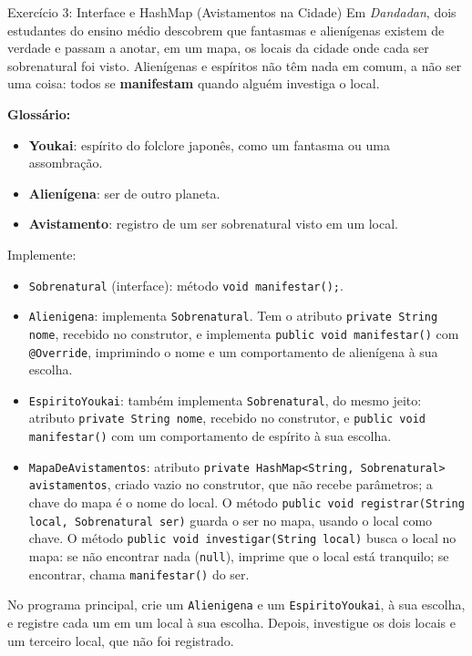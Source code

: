 \begin{exercicio}{Exercício 3: Interface e HashMap (Avistamentos na Cidade)}
Em \textit{Dandadan}, dois estudantes do ensino médio descobrem que fantasmas e alienígenas
existem de verdade e passam a anotar, em um mapa, os locais da cidade onde cada ser sobrenatural
foi visto. Alienígenas e espíritos não têm nada em comum, a não ser uma coisa: todos se
\textbf{manifestam} quando alguém investiga o local.

\textbf{Glossário:}
\begin{itemize}
    \item \textbf{Youkai}: espírito do folclore japonês, como um fantasma ou uma assombração.
    \item \textbf{Alienígena}: ser de outro planeta.
    \item \textbf{Avistamento}: registro de um ser sobrenatural visto em um local.
\end{itemize}

Implemente:

\begin{itemize}
    \item \texttt{Sobrenatural} (interface): método \texttt{void manifestar();}.

    \item \texttt{Alienigena}: implementa \texttt{Sobrenatural}. Tem o atributo
    \texttt{private String nome}, recebido no construtor, e implementa
    \texttt{public void manifestar()} com \texttt{@Override}, imprimindo o nome e um
    comportamento de alienígena à sua escolha.

    \item \texttt{EspiritoYoukai}: também implementa \texttt{Sobrenatural}, do mesmo jeito:
    atributo \texttt{private String nome}, recebido no construtor, e
    \texttt{public void manifestar()} com um comportamento de espírito à sua escolha.

    \item \texttt{MapaDeAvistamentos}: atributo
    \texttt{private HashMap<String, Sobrenatural> avistamentos}, criado vazio no construtor, que
    não recebe parâmetros; a chave do mapa é o nome do local. O método
    \texttt{public void registrar(String local, Sobrenatural ser)} guarda o ser no mapa, usando
    o local como chave. O método \texttt{public void investigar(String local)} busca o local no
    mapa: se não encontrar nada (\texttt{null}), imprime que o local está tranquilo; se
    encontrar, chama \texttt{manifestar()} do ser.
\end{itemize}

No programa principal, crie um \texttt{Alienigena} e um \texttt{EspiritoYoukai}, à sua escolha,
e registre cada um em um local à sua escolha. Depois, investigue os dois locais e um terceiro
local, que não foi registrado.
\end{exercicio}

